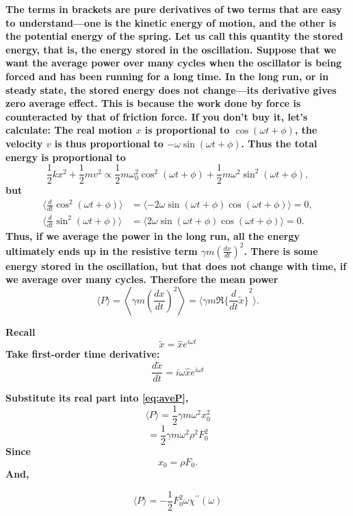 \documentclass[]{revtex4}
\newcommand{\st}[1]{{\color{red}\bfseries #1}}
\begin{document}
\st{
The terms in brackets are pure derivatives of two terms that are easy to understand—one is the kinetic energy of motion, and the other is the potential energy of the spring. Let us call this quantity the stored energy, that is, the energy stored in the oscillation. Suppose that we want the average power over many cycles when the oscillator is being forced and has been running for a long time. In the long run,
or in steady state, the stored energy does not change—its derivative gives zero average effect. This is because the work done by
force is counteracted by that of friction force. If you don't buy it, let's calculate:
The real motion $x$ is proportional to $\cos (\omega t + \phi)$,
the velocity $v$ is thus proportional to $- \omega \sin(\omega t + \phi)$.
Thus the total energy is proportional to
\begin{equation*}
 \frac{ 1 }{ 2 } k x^2 + \frac{ 1 }{ 2 } m v^2 
 \propto \frac{ 1 }{ 2 } m \omega_0^2 \cos^2 (\omega t + \phi)
 + \frac{ 1 }{ 2 } m \omega^2 \sin^2 (\omega t + \phi),
\end{equation*}
but 
\begin{align*}
  \langle \frac{ d }{ dt } \cos^2 (\omega t + \phi) \rangle
  &= \langle -2 \omega \sin(\omega t + \phi) \cos (\omega t + \phi) \rangle = 0, \\
   \langle \frac{ d }{ dt } \sin^2 (\omega t + \phi) \rangle
  &= \langle 2 \omega \sin(\omega t + \phi) \cos (\omega t + \phi) \rangle = 0.
\end{align*}
Thus, if we average the power in the long run, all the energy ultimately ends up in the resistive term $\gamma m\left(\frac{dx}{dt}\right)^2$.
There is some energy stored in the oscillation, but that does not change with time, if we average over many cycles. Therefore the mean power
}
\[\langle P\rangle=\left\langle \gamma m\left(\frac{dx}{dt}\right)^2\right\rangle
= \bigg\langle \gamma m \Re{\bigg\{ \frac{ d }{ dt } \tilde{x} \bigg\}}^2 \bigg\rangle. 
\label{eq:aveP}\]

\st{
Recall
}
\[\tilde{x}=\hat{x}e^{i\omega t}\]
\st{
Take first-order time derivative:
}
\[\frac{d\tilde{x}}{dt}=i\omega \hat{x}e^{i\omega t}\]

\st{
Substitute its real part into \eqref{eq:aveP},
}
\[\langle P\rangle=\frac{1}{2}\gamma m\omega^2 x_0^2\]
\[=\frac{1}{2}\gamma m\omega^2\rho^2F_0^2\]
\st{
Since
\begin{equation*}
  x_0 = \rho F_0.
\end{equation*}
And,
}

\[\langle P\rangle= -\frac{1}{2}F_0^2\omega\chi^{\prime\prime}(\omega)\]
\end{document}
